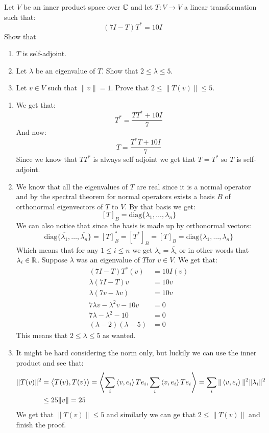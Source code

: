 \documentclass[11pt, a4paper]{article}
\begin{document}
\begin{exercise}
  Let $V$ be an inner product space over $\mathbb{C}$ and let 
  $T \colon V \to V$ a linear transformation such that:
  \[
    (7I - T)T^* = 10I
  \]
  Show that
  \begin{enumerate}
    \item[(1)] $T$ is self-adjoint.
    \item[(2)] Let $\lambda$ be an eigenvalue of $T$. Show that 
      $2 \le \lambda \le 5$.
    \item[(3)] Let $v \in V$ such that $\|v\| = 1$. Prove that 
      $2 \le \|T(v)\| \le 5$.
  \end{enumerate}
\end{exercise}
\begin{solution} \phantom{}
  \begin{enumerate}
\item[(1)]
  We get that:
  \[
    T^* = \frac{TT^* + 10I}{7}
  \]
  And now:
  \[
    T = \frac{T^*T + 10I}{7}
  \]
  Since we know that $TT^*$ is always self adjoint we get that $T = T^*$ so
  $T$ is self-adjoint.
\item[(2)]
We know that all the eigenvalues of $T$ are real since it is a normal 
operator and by the spectral theorem for normal operators exists a basis
$B$ of orthonormal eigenvectors of $T$ to $V$. By that basis we get:
\[
  [T]_B = \mathrm{diag}\{\lambda_1,\dots,\lambda_n\}
\]
We can also notice that since the basis is made up by orthonormal vectors:
\[
  \mathrm{diag}\{\overline{\lambda_1},\dots,\overline{\lambda_n}\} =
  [T]^*_B = [T^*]_B = [T]_B = 
  \mathrm{diag}\{\lambda_1,\dots,\lambda_n\}
\]
Which means that for any $1 \le i \le n$ we get 
$\lambda_i = \overline{\lambda_i}$ or in other words that $\lambda_i\in\mathbb{R}$.
Suppose $\lambda$ was an eigenvalue of $T$for $v\in V$. We get that:
\begin{align*}
  (7I - T)T^*(v) &= 10I(v) \\
  \lambda (7I - T)v &= 10v \\
  \lambda (7v - \lambda v) &= 10v \\
  7\lambda v - \lambda^2 v - 10v &= 0 \\
  7\lambda - \lambda^2  - 10 &= 0 \\
  (\lambda - 2)(\lambda - 5) &= 0
\end{align*}
This means that $2 \le \lambda \le 5$ as wanted.
\item[(3)]
It might be hard considering the norm only, but luckily we can use the inner
product and see that:
\begin{align*}
  \|T(v)\|^2 &= \left\langle T(v), T(v) \right\rangle = 
  \left\langle \sum_{i}{\left\langle v, e_i \right\rangle Te_i}, \sum_{i}{\left\langle v, e_i \right\rangle Te_i} \right\rangle = 
  \sum_{i}{\|\left\langle v, e_i \right\rangle\|^2\|\lambda_i\|^2} \\ &\le 
  25 \|v\| = 25
\end{align*}
We get that $\|T(v)\| \le 5$ and similarly we can ge that $2 \le \|T(v)\|$
and finish the proof.
\end{enumerate}
\end{solution}
\end{document}
